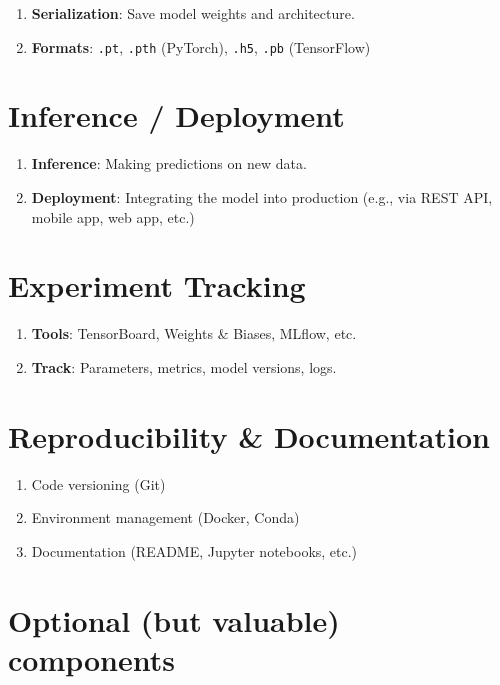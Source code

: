 \begin{enumerate}
    \item \textbf{Serialization}: Save model weights and architecture.
    \item \textbf{Formats}: \verb|.pt|, \verb|.pth| (PyTorch), \verb|.h5|, \verb|.pb| (TensorFlow)
\end{enumerate}



\section{Inference / Deployment}

\begin{enumerate}
    \item \textbf{Inference}: Making predictions on new data.
    \item \textbf{Deployment}: Integrating the model into production (e.g., via REST API, mobile app, web app, etc.)
\end{enumerate}



\section{Experiment Tracking}

\begin{enumerate}
    \item \textbf{Tools}: TensorBoard, Weights \& Biases, MLflow, etc.
    \item \textbf{Track}: Parameters, metrics, model versions, logs.
\end{enumerate}



\section{Reproducibility \& Documentation}

\begin{enumerate}
    \item Code versioning (Git)
    \item Environment management (Docker, Conda)
    \item Documentation (README, Jupyter notebooks, etc.)
\end{enumerate}



\section*{Optional (but valuable) components}

